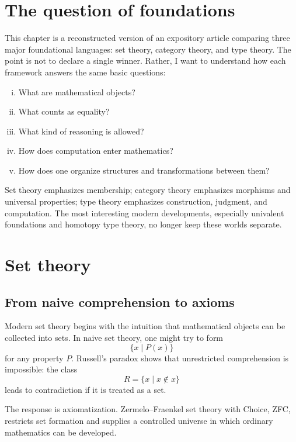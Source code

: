 
\section{The question of foundations}

This chapter is a reconstructed version of an expository article comparing three major foundational languages: set theory, category theory, and type theory.  The point is not to declare a single winner.  Rather, I want to understand how each framework answers the same basic questions:
\begin{enumerate}[(i)]
  \item What are mathematical objects?
  \item What counts as equality?
  \item What kind of reasoning is allowed?
  \item How does computation enter mathematics?
  \item How does one organize structures and transformations between them?
\end{enumerate}

Set theory emphasizes membership; category theory emphasizes morphisms and universal properties; type theory emphasizes construction, judgment, and computation.  The most interesting modern developments, especially univalent foundations and homotopy type theory, no longer keep these worlds separate.

\section{Set theory}

\subsection{From naive comprehension to axioms}

Modern set theory begins with the intuition that mathematical objects can be collected into sets.  In naive set theory, one might try to form
\[
  \{x\mid P(x)\}
\]
for any property \(P\).  Russell's paradox shows that unrestricted comprehension is impossible: the class
\[
  R=\{x\mid x\notin x\}
\]
leads to contradiction if it is treated as a set.

The response is axiomatization.  Zermelo--Fraenkel set theory with Choice, ZFC, restricts set formation and supplies a controlled universe in which ordinary mathematics can be developed.

